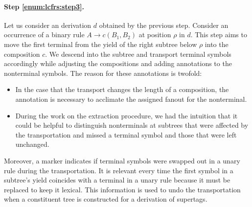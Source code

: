 \documentclass[../../document.tex]{subfiles}
\begin{document}
    \paragraph{Step \ref{enum:lcfrs:step3}.}
    Let us consider an  derivation \(d\) obtained by the previous step.
    Consider an occurrence of a binary rule $A \to c(B_1, B_2)$ at position \(\rho\) in \(d\).
    This step aims to move the first terminal from the yield of the right subtree below \(\rho\) into the composition \(c\).
    We descend into the subtree and transport terminal symbols accordingly while adjusting the compositions and adding annotations to the nonterminal symbols.
    The reason for these annotations is twofold:
    \begin{itemize}
        \item In the case that the transport changes the length of a composition, the annotation is necessary to acclimate the assigned fanout for the  nonterminal.
        \item
            During the work on the extraction procedure, we had the intuition that it could be helpful to distinguish nonterminals at subtrees that were affected by the transportation and missed a terminal symbol and those that were left unchanged.
    \end{itemize}
    Moreover, a marker indicates if terminal symbols were swapped out in a unary rule during the transportation.
    It is relevant every time the first symbol in a subtree's yield coincides with a terminal in a unary rule because it must be replaced to keep it lexical.
    This information is used to undo the transportation when a constituent tree is constructed for a derivation of supertags.
\end{document}

